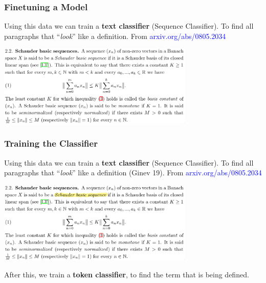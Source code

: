 \documentclass[10pt, handout]{beamer}
\begin{document}
\begin{frame}[fragile]
\begin{itemize}
\begin{columns}
\begin{column}{0.6\textwidth}
        \end{column}
    \end{columns}

\end{itemize}
\end{frame}


\begin{frame}
    \frametitle{Finetuning a Model}
    Using this data we can train a \textbf{text classifier} (Sequence Classifier). To find all paragraphs that ``\textit{look}'' like a definition. \pause From \textcolor{blue}{arxiv.org/abs/0805.2034}
    \begin{center}
        \includegraphics[width=0.7\textwidth]{../Images/def2.png}
    \end{center}
\end{frame}

\begin{frame}
    \frametitle{Training  the Classifier}
    Using this data we can train a \textbf{text classifier} (Sequence Classifier). To find all paragraphs that ``\textit{look}'' like a definition (Ginev 19). \pause From \textcolor{blue}{arxiv.org/abs/0805.2034}
    \begin{center}
        \includegraphics[width=0.7\textwidth]{../Images/def_highlighted.png}
    \end{center}
 After this, we train a \textbf{token classifier}, to find the term that is being defined.
\end{frame}
\end{document}
